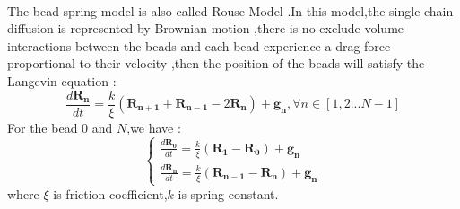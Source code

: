 \documentclass{article}
\begin{document}
	 \paragraph{}
	 The bead-spring model is also called Rouse Model .In this model,the single chain diffusion is represented by Brownian motion ,there is no exclude volume 	interactions between the beads and each bead experience a drag force proportional to their velocity ,then the position of the beads will satisfy the Langevin equation :
	 \begin{equation}
	 \frac{d\bm{R_n}}{dt}=\frac{k}{\xi}(\bm{R_{n+1}}+\bm{R_{n-1}}-2\bm{R_{n}})+\bm{g_n}, \forall n \in [1,2...N-1]
	 \end{equation}
	 For the bead $0$ and $N$,we have :
	 \[
	 \begin{cases}
	\frac{d\bm{R_0}}{dt}=\frac{k}{\xi}(\bm{R_{1}}-\bm{R_{0}})+\bm{g_n}\\
	\frac{d\bm{R_n}}{dt}=\frac{k}{\xi}(\bm{R_{n-1}}-\bm{R_{n}})+\bm{g_n}
	 \end{cases}
	 \]
	 where $\xi$ is friction coefficient,$k$ is spring constant.
\end{document}
